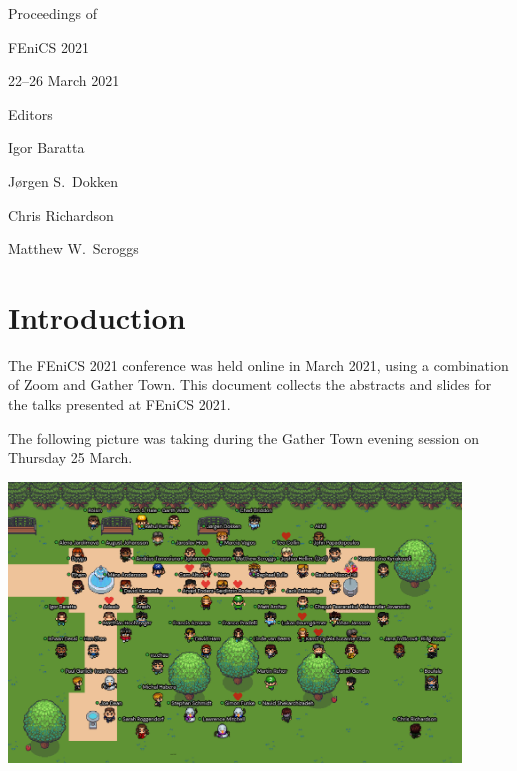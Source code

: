 \thispagestyle{empty}

\setcounter{page}{0}
\vspace*{6cm}
\begin{center}
\setmainfont[Scale=3]{Lato Bold}
Proceedings of
\end{center}
\begin{center}
\setmainfont[Scale=6]{Lato Bold}
FEniCS 2021
\end{center}
\begin{center}
\setmainfont[Scale=4]{Lato Bold}
22--26 March 2021
\end{center}

\vspace{8cm}

\begin{center}
\setmainfont[Scale=2]{Lato Bold}
Editors
\end{center}
\begin{center}
\setmainfont[Scale=1.3]{Lato}
Igor Baratta
\end{center}
\begin{center}
\setmainfont[Scale=1.3]{Lato}
J{\o}rgen S.\ Dokken
\end{center}
\begin{center}
\setmainfont[Scale=1.3]{Lato}
Chris Richardson
\end{center}
\begin{center}
\setmainfont[Scale=1.3]{Lato}
Matthew W.\ Scroggs
\end{center}


\tableofcontents


\chapter*{Introduction}
\setcounter{page}{1}

The FEniCS 2021 conference was held online in March 2021, using a combination of Zoom and Gather Town.
This document collects the abstracts and slides for the talks presented at FEniCS 2021.

The following picture was taking during the Gather Town evening session on Thursday 25 March.

\begin{center}
\includegraphics[width=0.9\textwidth]{../files/img/small-photo.png}
\end{center}


